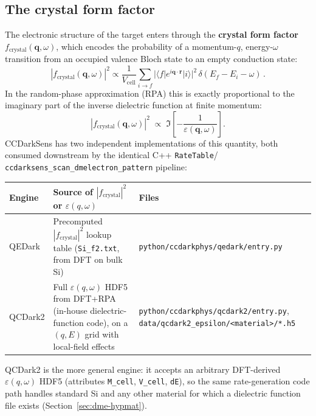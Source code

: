 \subsection{The crystal form factor}

The electronic structure of the target enters through the \textbf{crystal
form factor} $f_\mathrm{crystal}(\mathbf{q},\omega)$, which encodes the
probability of a momentum-$q$, energy-$\omega$ transition from an occupied
valence Bloch state to an empty conduction state:
\begin{equation}
|f_\mathrm{crystal}(\mathbf{q},\omega)|^2 \propto \frac{1}{V_\mathrm{cell}}
\sum_{i\to f} |\langle f | e^{i\mathbf{q}\cdot\mathbf{r}} | i\rangle|^2\,
\delta(E_f - E_i - \omega)\,.
\end{equation}
In the random-phase approximation (RPA) this is exactly proportional to the
imaginary part of the inverse dielectric function at finite momentum:
\begin{equation}
|f_\mathrm{crystal}(\mathbf{q},\omega)|^2 \;\propto\;
\Im\!\left[-\frac{1}{\varepsilon(\mathbf{q},\omega)}\right].
\end{equation}
CCDarkSens has two independent implementations of this quantity, both
consumed downstream by the identical C++ \texttt{RateTable}/
\texttt{ccdarksens\_scan\_dmelectron\_pattern} pipeline:

\begin{center}
\begin{tabular}{@{}p{2.1cm}p{6.5cm}p{5cm}@{}}
\toprule
Engine & Source of $|f_\mathrm{crystal}|^2$ or $\varepsilon(q,\omega)$ & Files \\
\midrule
QEDark & Precomputed $|f_\mathrm{crystal}|^2$ lookup table
  (\texttt{Si\_f2.txt}, from \citealt{Essig2016} DFT on bulk Si) &
  \texttt{python/ccdarkphys/qedark/entry.py} \\
QCDark2 & Full $\varepsilon(q,\omega)$ HDF5 from DFT+RPA (in-house
  dielectric-function code), on a $(q,E)$ grid with local-field effects &
  \texttt{python/ccdarkphys/qcdark2/entry.py},
  \texttt{data/qcdark2\_epsilon/<material>/*.h5} \\
\bottomrule
\end{tabular}
\end{center}

QCDark2 is the more general engine: it accepts an arbitrary DFT-derived
$\varepsilon(q,\omega)$ HDF5 (attributes \texttt{M\_cell}, \texttt{V\_cell},
\texttt{dE}), so the same rate-generation code path handles standard Si and
any other material for which a dielectric function file exists
(Section~\ref{sec:dme-hypmat}).

